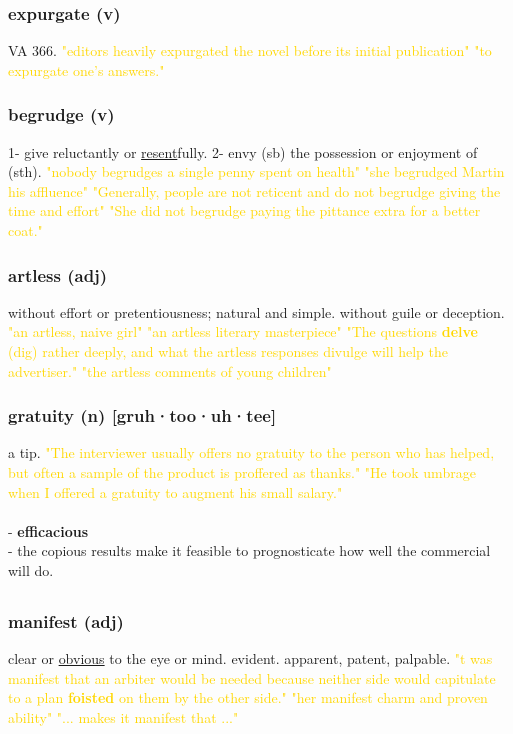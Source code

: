 \documentclass{proc}
\begin{document}
	\subsubsection{\textcolor{brickred}{expurgate} (v)}
	VA 366.
	\textcolor{gold}{"editors heavily expurgated the novel before its initial publication" "to expurgate one's answers."}
	
	\subsubsection{\textcolor{brickred}{begrudge} (v)}
	1- give reluctantly or \underline{resent}fully.
	2- envy (sb) the possession or enjoyment of (sth).
	\textcolor{gold}{"nobody begrudges a single penny spent on health" "she begrudged Martin his affluence" "Generally, people are  not reticent and do not begrudge giving the time and effort" "She did not begrudge paying the pittance extra for a better coat."}
	
	\subsubsection{\textcolor{brickred}{artless} (adj)}
	without effort or pretentiousness; natural and simple. without guile or deception.
	\textcolor{gold}{"an artless, naive girl" "an artless literary masterpiece" "The questions \textbf{delve} (dig) rather deeply, and what the artless responses divulge will help the advertiser." "the artless comments of young children"}
	
	\subsubsection{\textcolor{brickred}{gratuity} (n) [gruh·too·uh·tee]}
	a tip.
	\textcolor{gold}{ "The interviewer usually offers no gratuity to the person who has helped, but often a sample of the product is proffered as thanks." "He took umbrage when I offered a gratuity to augment his small salary."}\\\\
	- \textbf{efficacious}\\
	- the copious results make it feasible to prognosticate how well the commercial will do.
	
	\newpage
	\subsection{}
	\subsubsection{\textcolor{brickred}{manifest} (adj)}
	clear or \underline{obvious} to the eye or mind. evident. apparent,
	patent,
	palpable.
	\textcolor{gold}{"t was manifest that an arbiter would be needed because neither side would capitulate to a plan \textbf{foisted} on them by the other side." "her manifest charm and proven ability" "... makes it manifest that ..."}
	
\end{document}

